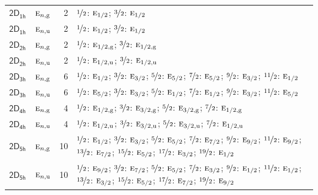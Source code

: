 \documentclass[10pt,a4paper]{article}
\numberwithin{equation}{section}
\newcommand{\grp}[1]{\mathsf{#1}}
\newcommand{\irr}[1]{\text{\normalfont\scshape #1}}
\newcommand{\ptag}[1]{\mathrm{#1}}
\newlength{\fillwidth}\newlength{\cellwidth}\newlength{\colwidth}
\begin{document}
{\begin{longtable}{@{}llr>{\RaggedRight\arraybackslash}p{\fillwidth}@{}}
\href{2D1h.pdf}{$\grp{2D_{1h}}$} & $\irr{e}_{n,\ptag{g}}$ & 2 & $\nicefrac{1}{2}$: $\irr{e}_{1/2}$; $\nicefrac{3}{2}$: $\irr{e}_{1/2}$\\
\href{2D1h.pdf}{$\grp{2D_{1h}}$} & $\irr{e}_{n,\ptag{u}}$ & 2 & $\nicefrac{1}{2}$: $\irr{e}_{1/2}$; $\nicefrac{3}{2}$: $\irr{e}_{1/2}$\\
\href{2D2h.pdf}{$\grp{2D_{2h}}$} & $\irr{e}_{n,\ptag{g}}$ & 2 & $\nicefrac{1}{2}$: $\irr{e}_{1/2,\ptag{g}}$; $\nicefrac{3}{2}$: $\irr{e}_{1/2,\ptag{g}}$\\
\href{2D2h.pdf}{$\grp{2D_{2h}}$} & $\irr{e}_{n,\ptag{u}}$ & 2 & $\nicefrac{1}{2}$: $\irr{e}_{1/2,\ptag{u}}$; $\nicefrac{3}{2}$: $\irr{e}_{1/2,\ptag{u}}$\\
\href{2D3h.pdf}{$\grp{2D_{3h}}$} & $\irr{e}_{n,\ptag{g}}$ & 6 & $\nicefrac{1}{2}$: $\irr{e}_{1/2}$; $\nicefrac{3}{2}$: $\irr{e}_{3/2}$; $\nicefrac{5}{2}$: $\irr{e}_{5/2}$; $\nicefrac{7}{2}$: $\irr{e}_{5/2}$; $\nicefrac{9}{2}$: $\irr{e}_{3/2}$; $\nicefrac{11}{2}$: $\irr{e}_{1/2}$\\
\href{2D3h.pdf}{$\grp{2D_{3h}}$} & $\irr{e}_{n,\ptag{u}}$ & 6 & $\nicefrac{1}{2}$: $\irr{e}_{5/2}$; $\nicefrac{3}{2}$: $\irr{e}_{3/2}$; $\nicefrac{5}{2}$: $\irr{e}_{1/2}$; $\nicefrac{7}{2}$: $\irr{e}_{1/2}$; $\nicefrac{9}{2}$: $\irr{e}_{3/2}$; $\nicefrac{11}{2}$: $\irr{e}_{5/2}$\\
\href{2D4h.pdf}{$\grp{2D_{4h}}$} & $\irr{e}_{n,\ptag{g}}$ & 4 & $\nicefrac{1}{2}$: $\irr{e}_{1/2,\ptag{g}}$; $\nicefrac{3}{2}$: $\irr{e}_{3/2,\ptag{g}}$; $\nicefrac{5}{2}$: $\irr{e}_{3/2,\ptag{g}}$; $\nicefrac{7}{2}$: $\irr{e}_{1/2,\ptag{g}}$\\
\href{2D4h.pdf}{$\grp{2D_{4h}}$} & $\irr{e}_{n,\ptag{u}}$ & 4 & $\nicefrac{1}{2}$: $\irr{e}_{1/2,\ptag{u}}$; $\nicefrac{3}{2}$: $\irr{e}_{3/2,\ptag{u}}$; $\nicefrac{5}{2}$: $\irr{e}_{3/2,\ptag{u}}$; $\nicefrac{7}{2}$: $\irr{e}_{1/2,\ptag{u}}$\\
\href{2D5h.pdf}{$\grp{2D_{5h}}$} & $\irr{e}_{n,\ptag{g}}$ & 10 & $\nicefrac{1}{2}$: $\irr{e}_{1/2}$; $\nicefrac{3}{2}$: $\irr{e}_{3/2}$; $\nicefrac{5}{2}$: $\irr{e}_{5/2}$; $\nicefrac{7}{2}$: $\irr{e}_{7/2}$; $\nicefrac{9}{2}$: $\irr{e}_{9/2}$; $\nicefrac{11}{2}$: $\irr{e}_{9/2}$; $\nicefrac{13}{2}$: $\irr{e}_{7/2}$; $\nicefrac{15}{2}$: $\irr{e}_{5/2}$; $\nicefrac{17}{2}$: $\irr{e}_{3/2}$; $\nicefrac{19}{2}$: $\irr{e}_{1/2}$\\
\href{2D5h.pdf}{$\grp{2D_{5h}}$} & $\irr{e}_{n,\ptag{u}}$ & 10 & $\nicefrac{1}{2}$: $\irr{e}_{9/2}$; $\nicefrac{3}{2}$: $\irr{e}_{7/2}$; $\nicefrac{5}{2}$: $\irr{e}_{5/2}$; $\nicefrac{7}{2}$: $\irr{e}_{3/2}$; $\nicefrac{9}{2}$: $\irr{e}_{1/2}$; $\nicefrac{11}{2}$: $\irr{e}_{1/2}$; $\nicefrac{13}{2}$: $\irr{e}_{3/2}$; $\nicefrac{15}{2}$: $\irr{e}_{5/2}$; $\nicefrac{17}{2}$: $\irr{e}_{7/2}$; $\nicefrac{19}{2}$: $\irr{e}_{9/2}$\\

\end{longtable}}
\end{document}
